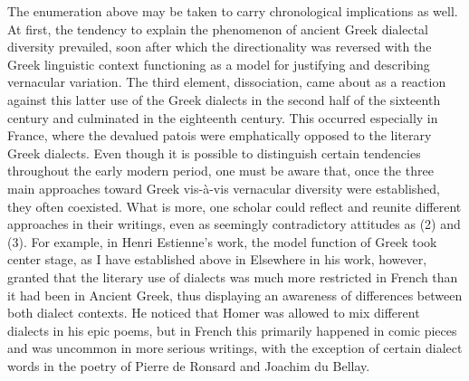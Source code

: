 The enumeration above may be taken to carry chronological implications as well. At first, the tendency to explain the phenomenon of ancient Greek dialectal diversity prevailed, soon after which the directionality was reversed with the Greek linguistic context functioning as a model for justifying and describing vernacular variation. The third element, dissociation, came about as a reaction against this latter use of the Greek dialects in the second half of the sixteenth century and culminated in the eighteenth century. This occurred especially in France, where the devalued patois were emphatically opposed to the literary Greek dialects. Even though it is possible to distinguish certain tendencies throughout the early modern period, one must be aware that, once the three main approaches toward Greek vis-à-vis vernacular diversity were established, they often coexisted. What is more, one scholar could reflect and reunite different approaches in their writings, even as seemingly contradictory attitudes as (2) and (3). For example, in Henri Estienne’s work, the model function of Greek took center stage, as I have established above in  Elsewhere in his work, however, \citet[93--94]{Estienne1587} granted that the literary use of dialects was much more restricted in French than it had been in Ancient Greek, thus displaying an awareness of differences between both dialect contexts. He noticed that Homer was allowed to mix different dialects in his epic poems, but in French this primarily happened in comic pieces and was uncommon in more serious writings, with the exception of certain dialect words in the poetry of Pierre de Ronsard and Joachim du Bellay.

